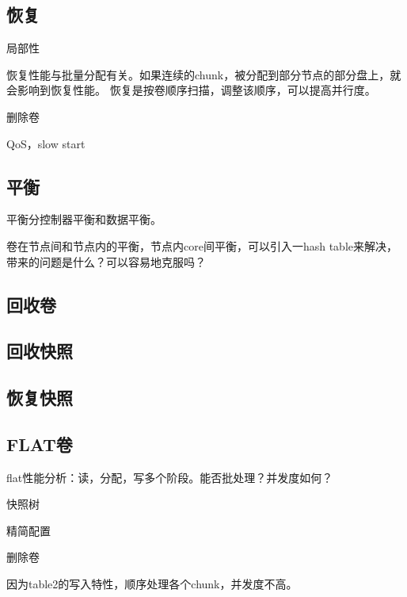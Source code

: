 \subsection{恢复}

局部性

恢复性能与批量分配有关。如果连续的chunk，被分配到部分节点的部分盘上，就会影响到恢复性能。
恢复是按卷顺序扫描，调整该顺序，可以提高并行度。

删除卷

QoS，slow start

\subsection{平衡}

平衡分控制器平衡和数据平衡。

卷在节点间和节点内的平衡，节点内core间平衡，可以引入一hash table来解决，
带来的问题是什么？可以容易地克服吗？

\subsection{回收卷}

\subsection{回收快照}

\subsection{恢复快照}

\subsection{FLAT卷}

flat性能分析：读，分配，写多个阶段。能否批处理？并发度如何？

快照树

精简配置

删除卷

因为table2的写入特性，顺序处理各个chunk，并发度不高。
